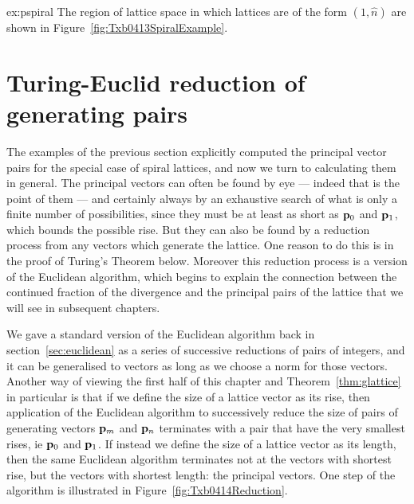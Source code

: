 \begin{jAnswer}{ex:pspiral}
The region of lattice space in which lattices are of the form $(1,\hat{n})$ are shown in Figure~\ref{fig:Txb0413SpiralExample}.

\end{jAnswer}
 

\section{Turing-Euclid reduction of generating pairs}
\label{sec:TEreduction}
The examples of the previous section explicitly computed the principal vector pairs for the special case of spiral lattices, and now we turn to calculating them in 
general. 
The principal vectors can often be found by eye --- indeed that is the point of them --- and certainly always by an exhaustive search of what is only a finite number of possibilities, since they must be at least as short as ${\mathbf p}_{0}$ and ${\mathbf p}_{1}$, which bounds the possible rise.
But they can also be found by a reduction process from any vectors which generate the lattice. One reason to do this is in the proof of Turing's Theorem below. Moreover this reduction process is a version of the Euclidean algorithm, which begins to explain the connection between the continued fraction of the divergence and the principal pairs of the lattice that we will see in subsequent chapters. 

We gave a standard version of the Euclidean algorithm back in section~\eqref{sec:euclidean} as a series of successive reductions of pairs of integers, and it can be generalised to vectors as long as we choose a norm for those vectors. Another way of viewing the first half of this chapter and Theorem~\ref{thm:glattice} in particular is that 
if we define the size of a lattice vector as its rise, then application of the Euclidean algorithm to successively reduce the size of pairs of generating  vectors ${\mathbf p}_{m}$ and ${\mathbf p}_{n}$  terminates with a pair that have the very smallest rises, ie ${\mathbf p}_{0}$ and ${\mathbf p}_{1}$. If instead we define the size of a lattice vector as its length, then the same Euclidean algorithm terminates not at the vectors with shortest rise, but the vectors with shortest length: the principal vectors. One step of the algorithm is illustrated in Figure~\ref{fig:Txb0414Reduction}.


